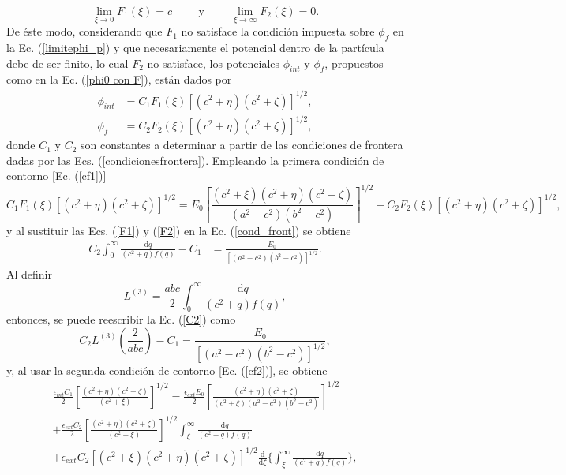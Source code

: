 \begin{equation}
    \lim_{\xi \to 0}F_1(\xi)=c\hspace{1cm}\mbox{y}\hspace{1cm} \lim_{\xi \to \infty}F_2(\xi)=0.
\end{equation}
De éste modo, considerando que $F_1$ no satisface la condición impuesta sobre $\phi_f$ en la Ec. (\ref{limitephi_p}) y que necesariamente el potencial dentro de la partícula debe de ser finito, lo cual $F_2$ no satisface, los potenciales $\phi_{int}$ y $\phi_f$, propuestos como en la Ec. (\ref{phi0 con F}), están dados por
\begin{align}
    \phi_{int}&=C_1F_1(\xi)[(c^2+\eta)(c^2+\zeta)]^{1/2}\label{phi_int},\\
    \phi_f&=C_2F_2(\xi)[(c^2+\eta)(c^2+\zeta)]^{1/2}\label{phi_p},
\end{align}
donde $C_1$ y $C_2$ son constantes a determinar a partir de las condiciones de frontera dadas por las Ecs. (\ref{condicionesfrontera}). Empleando la primera condición de contorno [Ec. (\ref{cf1})]
\begin{equation}
    C_1F_1(\xi)[(c^2+\eta)(c^2+\zeta)]^{1/2}=E_0\left[\frac{(c^2+\xi)(c^2+\eta)(c^2+\zeta)}{(a^2-c^2)(b^2-c^2)}\right]^{1/2}+C_2F_2(\xi)[(c^2+\eta)(c^2+\zeta)]^{1/2},
    \label{cond_front}
\end{equation}
y al sustituir las Ecs. (\ref{F1}) y (\ref{F2}) en la Ec. (\ref{cond_front}) se obtiene
\begin{align}
    C_2 \int_{0}^{\infty}\frac{\text{d}q}{(c^2+q)f(q)}-C_1&=\frac{E_0}{[(a^2-c^2)(b^2-c^2)]^{1/2}}.
    \label{C2}
\end{align}
Al definir
\begin{equation}
    L^{(3)}=\frac{abc}{2}\int_{0}^{\infty}\frac{\text{d}q}{(c^2+q)f(q)},
\end{equation}
entonces, se puede reescribir la Ec. (\ref{C2}) como
\begin{equation}
    C_2L^{(3)}\left(\frac{2}{abc}\right)-C_1=\frac{E_0}{[(a^2-c^2)(b^2-c^2)]^{1/2}},
    \label{ec1 de cf}
\end{equation}
y, al usar la segunda condición de contorno [Ec. (\ref{cf2})], se obtiene
\begin{multline*}
	\frac{\epsilon_{int} C_1}{2}\left[\frac{(c^2+\eta)(c^2+\zeta)}{(c^2+\xi)}\right]^{1/2} 
	= \frac{\epsilon_{ext} E_0}{2}\left[\frac{(c^2+\eta)(c^2+\zeta)}{(c^2+\xi)(a^2-c^2)(b^2-c^2)}\right]^{1/2} \\
	+ \frac{\epsilon_{ext} C_2}{2}\left[\frac{(c^2+\eta)(c^2+\zeta)}{(c^2+\xi)}\right]^{1/2}
	\int_{\xi}^{\infty}\frac{\text{d}q}{(c^2+q)f(q)} \\
	+ \epsilon_{ext} C_2[(c^2+\xi)(c^2+\eta)(c^2+\zeta)]^{1/2}
	\frac{\text{d}}{\text{d}\xi} \Bigg\{\int_{\xi}^{\infty}\frac{\text{d}q}{(c^2+q)f(q)}\Bigg\},
\end{multline*}
